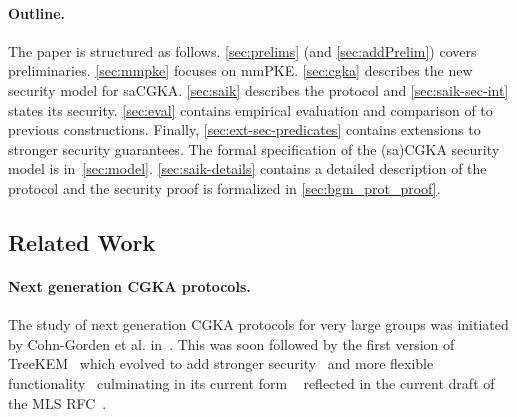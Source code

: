 
\paragraph{Outline.}
The paper is structured as follows. \cref{sec:prelims}
(and \cref{sec:addPrelim}) covers preliminaries. \cref{sec:mmpke}
focuses on mmPKE. \cref{sec:cgka} describes the new security model for
saCGKA. \cref{sec:saik} describes the \saik protocol and \cref{sec:saik-sec-int} states its security. \cref{sec:eval} contains empirical
evaluation and comparison of \saik to previous constructions. Finally, \cref{sec:ext-sec-predicates} contains extensions
to stronger security guarantees.
The formal specification of the (sa)CGKA security
model is in~\cref{sec:model}. \cref{sec:saik-details} contains a detailed description of the \saik protocol and the
security proof is formalized in \cref{sec:bgm_prot_proof}.



\subsection{Related Work}

\paragraph{Next generation CGKA protocols.}
The study of next generation CGKA protocols for very large groups was
initiated by Cohn-Gorden et al. in~\cite{CCS:CCGMM18}. This was soon followed
by the first version of TreeKEM~\cite{TreeKEM-original-email} which
evolved to add stronger
security~\cite{TreeKEM-original-email,TreeKEM-with-blanking-email,TreeKEM-tree-signing-email}
and more flexible functionality~\cite{TreeKEM-prop-and-comm-email}
culminating in its current form \protITK{}~\cite{EPRINT:AlwJosMul20}
reflected in the current draft of the MLS RFC~\cite{mls-protocol-latest}.

